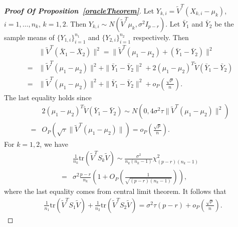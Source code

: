 \documentclass[review]{elsarticle}
\theoremstyle{plain}
\theoremstyle{definition}
\theoremstyle{remark}
\begin{document}
\begin{proof}[\textbf{Proof Of Proposition~\ref{oracleTheorem}}]
    Let $Y_{k,i}=\tilde{V}^T (X_{k,i}-\mu_k)$, $i=1,\ldots,n_k$, $k=1,2$.
    Then $Y_{k,i}\sim N(\tilde{V}^T\mu_k,\sigma^2 I_{p-r})$.
    Let $\bar{Y}_1$ and $\bar{Y}_2$ be the sample means of $\{Y_{1,i}\}_{i=1}^{n_1}$ and $\{Y_{2,i}\}_{i=1}^{n_2}$ respectively. 
    Then
    \begin{equation}\label{prop1eq1}
        \begin{aligned}
            &\|\tilde{V}^T(\bar{X}_1-\bar{X}_2)\|^2
            =\|\tilde{V}^T(\mu_1-\mu_2)+(\bar{Y}_1-\bar{Y}_2)\|^2\\
            =&\|\tilde{V}^T(\mu_1-\mu_2)\|^2+\|\bar{Y}_1-\bar{Y}_2\|^2+
            2{(\mu_1-\mu_2)}^T\tilde{V}(\bar{Y}_1-\bar{Y}_2)\\
            =&\|\tilde{V}^T(\mu_1-\mu_2)\|^2+\|\bar{Y}_1-\bar{Y}_2\|^2+
            o_P(\frac{\sqrt{p}}{n}).
        \end{aligned}
    \end{equation}
    The last equality holds since
    \begin{equation*}
        \begin{aligned}
            &2{(\mu_1-\mu_2)}^T\tilde{V}(\bar{Y}_1-\bar{Y}_2)\sim N(0,4\sigma^2 \tau \|\tilde{V}^T(\mu_1-\mu_2)\|^2)\\
            =& O_P(\sqrt{\tau}\|\tilde{V}^T(\mu_1-\mu_2)\| )=o_P(\frac{\sqrt{p}}{n}).
        \end{aligned}
    \end{equation*}
    For $k=1,2$, we have
    \begin{equation*}
        \begin{aligned}
            &\frac{1}{n_k} \mathrm{tr}(\tilde{V}^T S_k \tilde{V})\sim \frac{\sigma^2}{n_k(n_k-1)}\chi^2_{(p-r)(n_k-1)}\\
            =&
            \sigma^2\frac{p-r}{n_k}(1+O_P(\frac{1}{\sqrt{(p-r)(n_k-1)}})),
        \end{aligned}
    \end{equation*}
    where the last equality comes from central limit theorem. It follows that
    \begin{equation}\label{prop1eq2}
        \begin{aligned}
            &\frac{1}{n_1} \mathrm{tr}(\tilde{V}^T S_1 \tilde{V})+
            \frac{1}{n_2} \mathrm{tr}(\tilde{V}^T S_2 \tilde{V})=\sigma^2 \tau (p-r)+o_P(\frac{\sqrt{p}}{n}).
        \end{aligned}
    \end{equation}


\end{proof}
\end{document}
